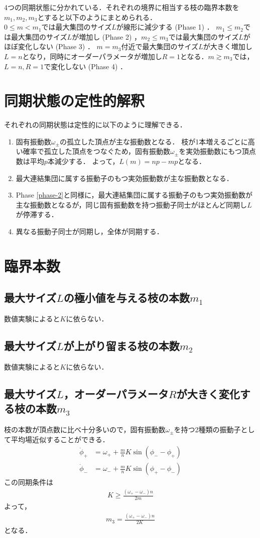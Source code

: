 \documentclass[../main]{subfiles}
\begin{document}
4つの同期状態に分かれている．それぞれの境界に相当する枝の臨界本数を$m_1,m_2,m_3$とすると以下のようにまとめられる．\\
$0\leq m<m_1$では最大集団のサイズ$L$が線形に減少する (Phase 1) ．
$m_1\leq m_2$では最大集団のサイズ$L$が増加し (Phase 2) ，$m_2\leq m_3$では最大集団のサイズ$L$がほぼ変化しない (Phase 3) ．
$m=m_3$付近で最大集団のサイズ$L$が大きく増加し$L=n$となり，同時にオーダーパラメータが増加し$R=1$となる．$m\gtrsim m_3$では，$L=n,R=1$で変化しない (Phase 4) ．
\section{同期状態の定性的解釈}
それぞれの同期状態は定性的に以下のように理解できる．
\renewcommand{\labelenumi}{Phase \theenumi}
\begin{enumerate}
    \item 固有振動数$\omega_\pm$の孤立した頂点が主な振動数となる．
    枝が1本増えるごとに高い確率で孤立した頂点をつなぐため，固有振動数$\omega_\pm$を実効振動数にもつ頂点数は平均$p$本減少する．
    よって，$L(m)=np-mp$となる．
    \item \label{phase-2}最大連結集団に属する振動子のもつ実効振動数が主な振動数となる．
    \item Phase \ref{phase-2}と同様に，最大連結集団に属する振動子のもつ実効振動数が主な振動数となるが，同じ固有振動数を持つ振動子同士がほとんど同期し$L$が停滞する．
    \item 異なる振動子同士が同期し，全体が同期する．
\end{enumerate}
\section{臨界本数}
\subsection{最大サイズ$L$の極小値を与える枝の本数$m_1$}
数値実験によると$K$に依らない．
\subsection{最大サイズ$L$が上がり留まる枝の本数$m_2$}
数値実験によると$K$に依らない．
\subsection{最大サイズ$L$，オーダーパラメータ$R$が大きく変化する枝の本数$m_3$}
枝の本数が頂点数に比べ十分多いので，固有振動数$\omega_\pm$を持つ2種類の振動子として平均場近似することができる．
\begin{align*}
    \dot{\phi}_+&=\omega_++\frac{m}{n}K\sin(\phi_--\phi_+)\\
    \dot{\phi}_-&=\omega_-+\frac{m}{n}K\sin(\phi_+-\phi_-)
\end{align*}
この同期条件は
\begin{align*}
    K\geq \frac{(\omega_+-\omega_-)n}{2m}
\end{align*}
よって，
\begin{align*}
    m_3=\frac{(\omega_+-\omega_-)n}{2K}
\end{align*}
となる．
\end{document}
